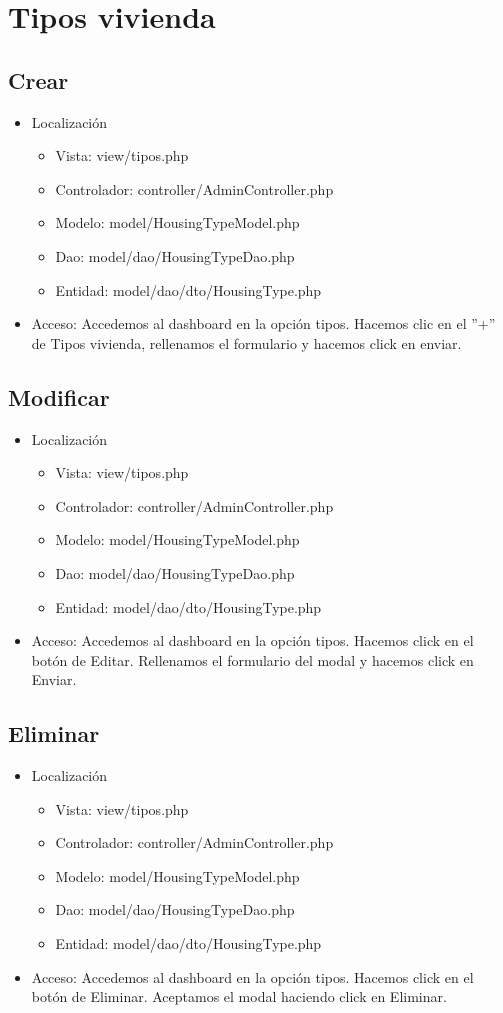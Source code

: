 \section{Tipos vivienda}
\subsection{Crear}
\begin{itemize}
\item Localizaci\'{o}n
\begin{itemize}
\item Vista: view/tipos.php
\item Controlador: controller/AdminController.php
\item Modelo: model/HousingTypeModel.php
\item Dao: model/dao/HousingTypeDao.php
\item Entidad: model/dao/dto/HousingType.php
\end{itemize}
\item Acceso: Accedemos al dashboard en la opci\'{o}n tipos. Hacemos clic en el ''+'' de Tipos vivienda, rellenamos el formulario y hacemos click en enviar.
\end{itemize}
\subsection{Modificar}
\begin{itemize}
\item Localizaci\'{o}n
\begin{itemize}
\item Vista: view/tipos.php
\item Controlador: controller/AdminController.php
\item Modelo: model/HousingTypeModel.php
\item Dao: model/dao/HousingTypeDao.php
\item Entidad: model/dao/dto/HousingType.php
\end{itemize}
\item Acceso: Accedemos al dashboard en la opci\'{o}n tipos. Hacemos click en el bot\'{o}n de Editar. Rellenamos el formulario del modal y hacemos click en Enviar.  
\end{itemize}
\subsection{Eliminar}
\begin{itemize}
\item Localizaci\'{o}n
\begin{itemize}
\item Vista: view/tipos.php
\item Controlador: controller/AdminController.php
\item Modelo: model/HousingTypeModel.php
\item Dao: model/dao/HousingTypeDao.php
\item Entidad: model/dao/dto/HousingType.php
\end{itemize}
\item Acceso: Accedemos al dashboard en la opci\'{o}n tipos. Hacemos click en el bot\'{o}n de Eliminar. Aceptamos el modal haciendo click en Eliminar.  
\end{itemize}
